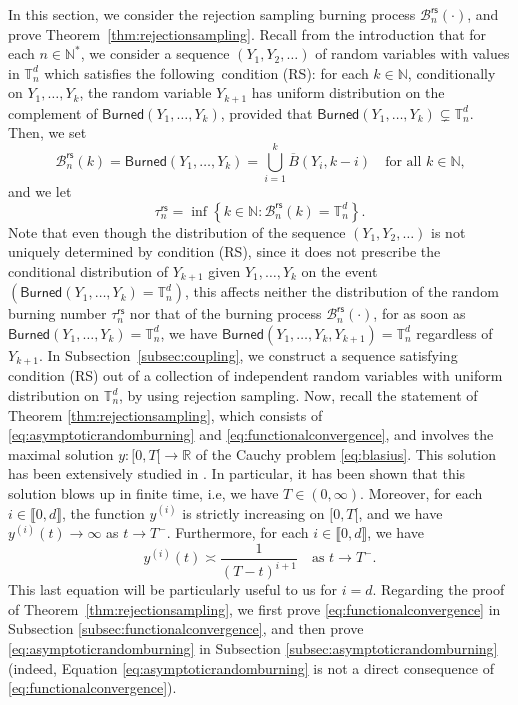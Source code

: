 \documentclass[a4paper,11pt]{article}
\begin{document}
In this section, we consider the rejection sampling burning process $\mathcal{B}_n^\mathsf{rs}(\cdot)$, and prove Theorem~\ref{thm:rejectionsampling}.
Recall from the introduction that for each $n\in\mathbb{N}^*$, we consider a sequence $(Y_1,Y_2,\ldots)$ of random variables with values in $\mathbb{T}_n^d$ which satisfies the following condition (RS): for each $k\in\mathbb{N}$, conditionally on $Y_1,\ldots,Y_k$, the random variable $Y_{k+1}$ has uniform distribution on the complement of $\mathsf{Burned}(Y_1,\ldots,Y_k)$, provided that $\mathsf{Burned}(Y_1,\ldots,Y_k)\varsubsetneq\mathbb{T}_n^d$.
Then, we set
\[\mathcal{B}_n^\mathsf{rs}(k)=\mathsf{Burned}(Y_1,\ldots,Y_k)=\bigcup_{i=1}^k\overline{B}(Y_i,k-i)\quad\text{for all $k\in\mathbb{N}$,}\]
and we let
\[\tau_n^\mathsf{rs}=\inf\left\{k\in\mathbb{N}:\mathcal{B}_n^\mathsf{rs}(k)=\mathbb{T}_n^d\right\}.\]
Note that even though the distribution of the sequence $(Y_1,Y_2,\ldots)$ is not uniquely determined by condition (RS), since it does not prescribe the conditional distribution of $Y_{k+1}$ given $Y_1,\ldots,Y_k$ on the event $\left(\mathsf{Burned}(Y_1,\ldots,Y_k)=\mathbb{T}_n^d\right)$, this affects neither the distribution of the random burning number $\tau_n^\mathsf{rs}$ nor that of the burning process $\mathcal{B}_n^\mathsf{rs}(\cdot)$, for as soon as ${\mathsf{Burned}(Y_1,\ldots,Y_k)=\mathbb{T}_n^d}$, we have $\mathsf{Burned}(Y_1,\ldots,Y_k,Y_{k+1})=\mathbb{T}_n^d$ regardless of $Y_{k+1}$.
In Subsection~\ref{subsec:coupling}, we construct a sequence satisfying condition (RS) out of a collection of independent random variables with uniform distribution on $\mathbb{T}_n^d$, by using rejection sampling.
Now, recall the statement of Theorem \ref{thm:rejectionsampling}, which consists of \eqref{eq:asymptoticrandomburning} and \eqref{eq:functionalconvergence}, and involves the maximal solution ${y:{[0,T[}\rightarrow\mathbb{R}}$ of the Cauchy problem \eqref{eq:blasius}.
This solution has been extensively studied in \cite{blasius}.
In particular, it has been shown that this solution blows up in finite time, i.e, we have $T\in(0,\infty)$.
Moreover, for each $i\in\llbracket0,d\rrbracket$, the function $y^{(i)}$ is strictly increasing on $[0,T[$, and we have $y^{(i)}(t)\rightarrow\infty$ as $t\to T^-$.
Furthermore, for each $i\in\llbracket0,d\rrbracket$, we have
\begin{equation}\label{eq:blowuprate}
y^{(i)}(t)\asymp\frac{1}{(T-t)^{i+1}}\quad\text{as $t\to T^-$.}
\end{equation}
This last equation will be particularly useful to us for $i=d$.
Regarding the proof of Theorem~\ref{thm:rejectionsampling}, we first prove \eqref{eq:functionalconvergence} in Subsection \ref{subsec:functionalconvergence}, and then prove \eqref{eq:asymptoticrandomburning} in Subsection \ref{subsec:asymptoticrandomburning} (indeed, Equation \eqref{eq:asymptoticrandomburning} is not a direct consequence of \eqref{eq:functionalconvergence}).
\end{document}
